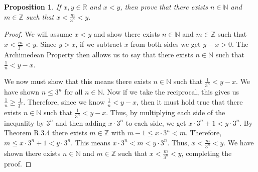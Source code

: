 \documentclass[11 pt]{article}
\newtheorem{proposition}{Proposition}
\newcommand{\newpar}{\vspace{.15in}\noindent}
\begin{document}
\newpar
\begin{proposition}
If $x, y \in \mathbb{R}$ and $x < y$, then prove that there exists $n \in \mathbb{N}$ and $m \in \mathbb{Z}$ such that $x <\frac{m}{3^n}<y$.

\end{proposition}
\begin{proof}
We will assume $x<y$ and show there exists $n \in \mathbb{N}$ and $m \in \mathbb{Z}$ such that $x <\frac{m}{3^n}<y$. Since $y>x$, if we subtract $x$ from both sides we get $y-x>0$. The Archimedean Property then allows us to say that there exists $n\in \mathbb{N}$ such that $\frac{1}{n}<y-x$.

\newpar
We now must show that this means there exists $n\in \mathbb{N}$ such that $\frac{1}{3^n}<y-x$.
We have shown $n\le3^n$ for all $n\in\mathbb{N}$. Now if we take the reciprocal, this gives us $\frac{1}{n}\ge\frac{1}{3^n}$. Therefore, since we know $\frac{1}{n}<y-x$, then it must hold true that there exists $n\in \mathbb{N}$ such that $\frac{1}{3^n}<y-x$. Thus, by multiplying each side of the inequality by $3^n$ and then adding $x\cdot3^n$ to each side, we get $x\cdot3^n+1<y\cdot3^n$. By Theorem R.3.4 there exists $m\in \mathbb{Z}$ with $m-1\le x\cdot3^n<m$. Therefore, $m\le x\cdot3^n+1<y\cdot3^n$. This means $x\cdot3^n<m<y\cdot3^n$. Thus, $x<\frac{m}{3^n}<y$. We have shown there exists $n\in \mathbb{N}$ and $m\in \mathbb{Z}$ such that $x<\frac{m}{3^n}<y$, completing the proof.
\end{proof}
\end{document}
